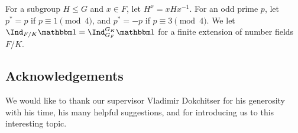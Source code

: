 For a subgroup $H \leq G$ and $x \in F$, let $H^{x} = x H x^{-1}$.  
For an odd prime $p$, let $p^* = p$ if $p \equiv 1 \pmod 4$, and $p^* = -p$ if $p \equiv 3 \pmod 4$. We let 
$\Ind_{F / K} \trivial  = \Ind_{G_F}^{G_K} \trivial$ for a finite extension of number fields $F / K$.


\subsection*{Acknowledgements}

We would like to thank our supervisor Vladimir Dokchitser for his generosity with his time, his many helpful suggestions, and for introducing us to this interesting topic.